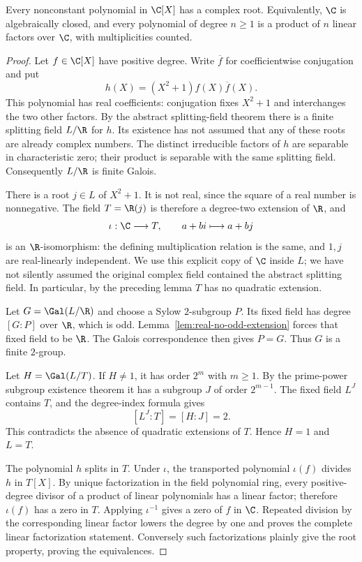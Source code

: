 \begin{theorem}\label{thm:algebraic-fta}
Every nonconstant polynomial in $\C[X]$ has a complex root. Equivalently, $\C$ is algebraically closed, and every polynomial of degree $n\geq1$ is a product of $n$ linear factors over $\C$, with multiplicities counted.
\end{theorem}
\begin{proof}
Let $f\in\C[X]$ have positive degree. Write $\overline f$ for coefficientwise conjugation and put
\[h(X)=(X^2+1)f(X)\overline f(X).\]
This polynomial has real coefficients: conjugation fixes $X^2+1$ and interchanges the two other factors. By the abstract splitting-field theorem there is a finite splitting field $L/\R$ for $h$. Its existence has not assumed that any of these roots are already complex numbers. The distinct irreducible factors of $h$ are separable in characteristic zero; their product is separable with the same splitting field. Consequently $L/\R$ is finite Galois.

There is a root $j\in L$ of $X^2+1$. It is not real, since the square of a real number is nonnegative. The field $T=\R(j)$ is therefore a degree-two extension of $\R$, and
\[\iota:\C\longrightarrow T,\qquad a+bi\longmapsto a+bj\]
is an $\R$-isomorphism: the defining multiplication relation is the same, and $1,j$ are real-linearly independent. We use this explicit copy of $\C$ inside $L$; we have not silently assumed the original complex field contained the abstract splitting field. In particular, by the preceding lemma $T$ has no quadratic extension.

Let $G=\Gal(L/\R)$ and choose a Sylow $2$-subgroup $P$. Its fixed field has degree $[G:P]$ over $\R$, which is odd. Lemma~\ref{lem:real-no-odd-extension} forces that fixed field to be $\R$. The Galois correspondence then gives $P=G$. Thus $G$ is a finite $2$-group.

Let $H=\Gal(L/T)$. If $H\ne1$, it has order $2^m$ with $m\geq1$. By the prime-power subgroup existence theorem it has a subgroup $J$ of order $2^{m-1}$. The fixed field $L^J$ contains $T$, and the degree-index formula gives
\[[L^J:T]=[H:J]=2.\]
This contradicts the absence of quadratic extensions of $T$. Hence $H=1$ and $L=T$.

The polynomial $h$ splits in $T$. Under $\iota$, the transported polynomial $\iota(f)$ divides $h$ in $T[X]$. By unique factorization in the field polynomial ring, every positive-degree divisor of a product of linear polynomials has a linear factor; therefore $\iota(f)$ has a zero in $T$. Applying $\iota^{-1}$ gives a zero of $f$ in $\C$. Repeated division by the corresponding linear factor lowers the degree by one and proves the complete linear factorization statement. Conversely such factorizations plainly give the root property, proving the equivalences.
\end{proof}

